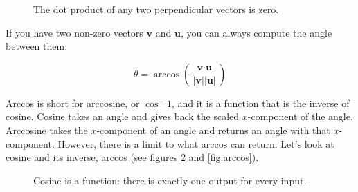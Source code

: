 \begin{figure}[H]
    \centering
    \caption{The dot product of any two perpendicular vectors is zero.}
    \label{fig:perpendicular}
\end{figure}
If you have two non-zero vectors $\textbf{v}$ and $\textbf{u}$, you can always 
compute the angle between them:

$$\theta = \arccos{ \left( \frac{\textbf{v} \cdot \textbf{u}}{|\textbf{v}| 
|\textbf{u}|} \right)}$$

Arccos is short for arccosine, or $\cos^-1$, and it is a function that is the 
inverse of cosine. Cosine takes an angle and gives back the scaled 
$x$-component of the angle. Arccosine takes the $x$-component of an angle and 
returns an angle with that $x$-component. However, there is a limit to what 
arccos can return. Let's look at cosine and its inverse, arccos (see figures 
\ref{fig:cosine} and \ref{fig:arccos}). 

\begin{figure}[H]
    \centering
        \caption{Cosine is a function: there is exactly one output for every 
        input.}
    \label{fig:cosine}
\end{figure}

